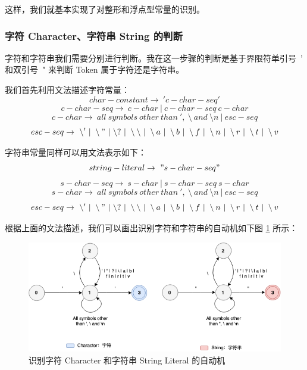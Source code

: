\documentclass[UTF8]{ctexart}
\begin{document}
这样，我们就基本实现了对整形和浮点型常量的识别。

\subsubsection{字符 Character、字符串 String 的判断}
字符和字符串我们需要分别进行判断。我在这一步骤的判断是基于界限符单引号\ ' 和双引号\ " 来判断 Token 属于字符还是字符串。

我们首先利用文法描述字符常量：
\begin{equation}
  char-constant \rightarrow\ 'c-char-seq'
\end{equation}
\begin{equation}
  c-char-seq \rightarrow\ c-char\ |\ c-char-seq\ c-char
\end{equation}
\begin{equation}
  c-char \rightarrow\ all\ symbols\ other\ than\ ', \ \setminus\ and\ \setminus n\ |\ esc-seq
\end{equation}
\begin{equation}
  esc-seq \rightarrow\ \setminus'\ |\ \setminus"\ |\ \setminus?\ |\ \setminus\setminus\ |\ \setminus a\ |\ \setminus b\ |\ \setminus f\ |\ \setminus n\ |\ \setminus r\ |\ \setminus t\ |\ \setminus v
\end{equation}

字符串常量同样可以用文法表示如下：
\begin{equation}
  string-literal \rightarrow\ "s-char-seq"
\end{equation}
\begin{equation}
  s-char-seq \rightarrow\ s-char\ |\ s-char-seq\ s-char
\end{equation}
\begin{equation}
  s-char \rightarrow\ all\ symbols\ other\ than\ ', \ \setminus\ and\ \setminus n\ |\ esc-seq
\end{equation}
\begin{equation}
  esc-seq \rightarrow\ \setminus'\ |\ \setminus"\ |\ \setminus?\ |\ \setminus\setminus\ |\ \setminus a\ |\ \setminus b\ |\ \setminus f\ |\ \setminus n\ |\ \setminus r\ |\ \setminus t\ |\ \setminus v
\end{equation}

根据上面的文法描述，我们可以画出识别字符和字符串的自动机如下图 \ref{fig:figure4} 所示：

\begin{figure}[ht]
  \centering
  \includegraphics[width=\linewidth]{images/string.png}
  \caption{识别字符 Character 和字符串 String Literal 的自动机}
  \label{fig:figure4}
\end{figure}
\end{document}
